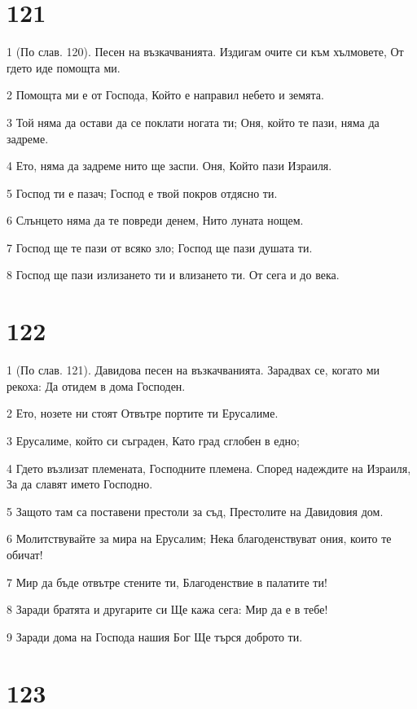 \chapter{121}

\par 1 (По слав. 120). Песен на възкачванията. Издигам очите си към хълмовете, От гдето иде помощта ми.
\par 2 Помощта ми е от Господа, Който е направил небето и земята.
\par 3 Той няма да остави да се поклати ногата ти; Оня, който те пази, няма да задреме.
\par 4 Ето, няма да задреме нито ще заспи. Оня, Който пази Израиля.
\par 5 Господ ти е пазач; Господ е твой покров отдясно ти.
\par 6 Слънцето няма да те повреди денем, Нито луната нощем.
\par 7 Господ ще те пази от всяко зло; Господ ще пази душата ти.
\par 8 Господ ще пази излизането ти и влизането ти. От сега и до века.

\chapter{122}

\par 1 (По слав. 121). Давидова песен на възкачванията. Зарадвах се, когато ми рекоха: Да отидем в дома Господен.
\par 2 Ето, нозете ни стоят Отвътре портите ти Ерусалиме.
\par 3 Ерусалиме, който си съграден, Като град сглобен в едно;
\par 4 Гдето възлизат племената, Господните племена. Според надеждите на Израиля, За да славят името Господно.
\par 5 Защото там са поставени престоли за съд, Престолите на Давидовия дом.
\par 6 Молитствувайте за мира на Ерусалим; Нека благоденствуват ония, които те обичат!
\par 7 Мир да бъде отвътре стените ти, Благоденствие в палатите ти!
\par 8 Заради братята и другарите си Ще кажа сега: Мир да е в тебе!
\par 9 Заради дома на Господа нашия Бог Ще търся доброто ти.

\chapter{123}

